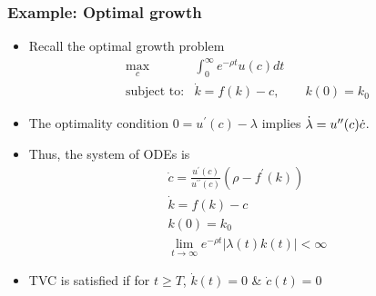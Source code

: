 \documentclass[bigger,handout]{beamer}
\newenvironment{stepitemize}{\begin{itemize}[<+->]}{\end{itemize} }
\begin{document}
\begin{frame}%
 
\frametitle{Example: Optimal growth}

\begin{stepitemize}
\item Recall the optimal growth problem%
\begin{equation*}
\begin{array}{rl}
\max_{c} & \int_{0}^{\infty }e^{-\rho t}u(c)dt \\ 
\text{subject to:} & \dot{k}=f(k)-c,\qquad k(0)=k_{0}%
\end{array}%
\end{equation*}

\item The optimality condition $0=u^{\prime }(c)-\lambda $ implies $\dot{%
\lambda}=u^{\prime \prime }(c)\dot{c}$.

\item Thus, the system of ODEs is 
\begin{gather*}
\dot{c}=\frac{u^{\prime }(c)}{u^{\prime \prime }(c)}\left( \rho -f^{\prime
}(k)\right) \\
\dot{k}=f(k)-c \\
k(0)=k_{0} \\
\lim_{t\rightarrow \infty }e^{-\rho t}|\lambda (t)k(t)|<\infty
\end{gather*}

\item TVC is satisfied if for $t\geq T$, $\dot{k}(t)=0$ \& $\dot{c}(t)=0$
\end{stepitemize}

 
 
\end{frame}%
 
 
 
\end{document}
